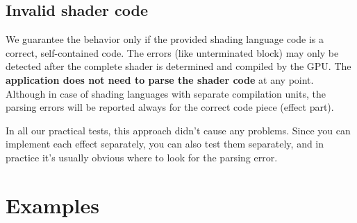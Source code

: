 \documentclass{egpubl}
\begin{document}
\subsection{Invalid shader code}

We guarantee the behavior only if the provided shading language code
is a correct, self-contained code. The errors (like unterminated block)
may only be detected after the complete shader
is determined and compiled by the GPU.
The \textbf{application does not need to parse the shader code} at any point.
Although in case of shading languages with separate compilation units,
the parsing errors will be reported always for the correct code piece
(effect part).

In all our practical tests, this approach didn't cause any problems.
Since you can implement each effect separately, you can also test them separately,
and in practice it's usually obvious where to look for the parsing error.



\section{Examples}
\end{document}
